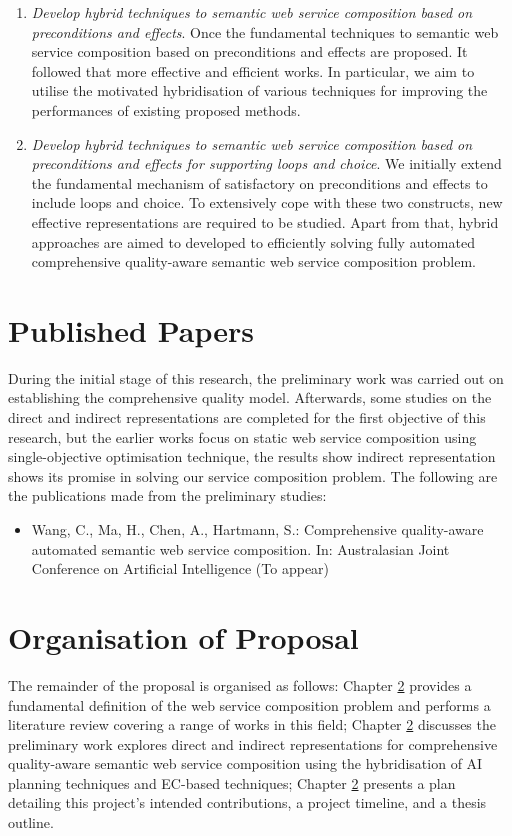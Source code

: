 \begin{enumerate}
\begin{enumerate}
  \item \emph{Develop hybrid techniques to semantic web service composition based on preconditions and effects}. Once the fundamental techniques to semantic web service composition based on preconditions and effects are proposed. It followed that more effective and efficient works. In particular, we aim to utilise the motivated hybridisation of various techniques for improving the performances of existing proposed methods.
    
   \item \emph{Develop hybrid techniques to semantic web service composition based on preconditions and effects for supporting loops and choice}. We initially extend the fundamental mechanism of satisfactory on preconditions and effects to include loops and choice. To extensively cope with these two constructs, new effective representations are required to be studied. Apart from that,  hybrid approaches are aimed to developed to efficiently solving fully automated comprehensive quality-aware semantic web service composition problem.

 
 \end{enumerate}
 
\end{enumerate}

\section{Published Papers}

During the initial stage of this research, the preliminary work was carried out on establishing the comprehensive quality model.  Afterwards, some studies on the direct and indirect representations are completed for the first objective of this research, but the earlier works focus on static web service composition using single-objective optimisation technique, the results show indirect representation shows its promise in solving our service composition problem.  The following are the publications made from the preliminary studies:

\begin{itemize}
 \item Wang, C., Ma, H., Chen, A., Hartmann, S.: Comprehensive quality-aware automated semantic web service composition. In: Australasian Joint Conference on Artificial Intelligence (To appear)
\end{itemize}


\section{Organisation of Proposal}The remainder of the proposal is organised as follows: Chapter \ref{} provides a fundamental definition of the web service composition problem and performs a literature review covering a range of works in this field; Chapter \ref{} discusses the preliminary work explores direct and indirect representations for comprehensive quality-aware semantic web service composition using the hybridisation of AI planning techniques and EC-based techniques; Chapter \ref{} presents a plan detailing this project's intended contributions, a project timeline, and a thesis outline.
